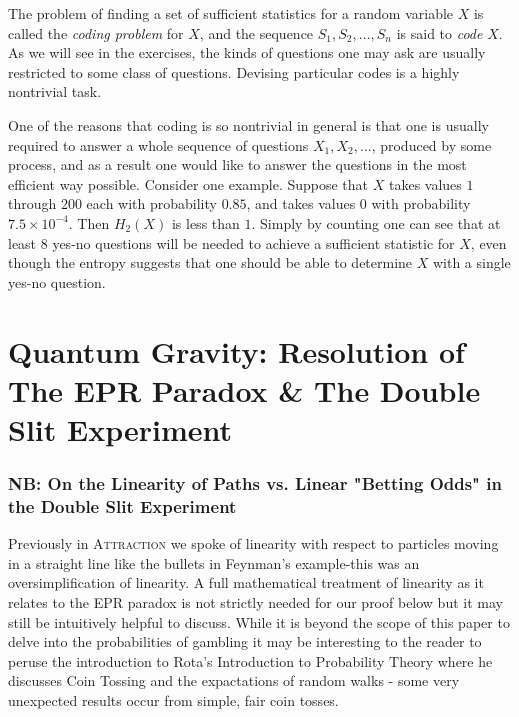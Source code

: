 \documentclass{report}
\begin{document}
The problem of finding a set of sufficient statistics for a random variable \( X \) is called the \emph{coding problem} for \( X \), and the sequence \( S_1, S_2, \ldots, S_n \) is said to \emph{code} \( X \). As we will see in the exercises, the kinds of questions one may ask are usually restricted to some class of questions. Devising particular codes is a highly nontrivial task.

One of the reasons that coding is so nontrivial in general is that one is usually required to answer a whole sequence of questions \( X_1, X_2, \ldots \), produced by some process, and as a result one would like to answer the questions in the most efficient way possible. Consider one example. Suppose that \( X \) takes values \( 1 \) through \( 200 \) each with probability \( 0.85 \), and takes values \( 0 \) with probability \( 7.5 \times 10^{-4} \). Then \( H_2(X) \) is less than \( 1 \). Simply by counting one can see that at least \( 8 \) yes-no questions will be needed to achieve a sufficient statistic for \( X \), even though the entropy suggests that one should be able to determine \( X \) with a single yes-no question.

\section*{Quantum Gravity: Resolution of The EPR Paradox \& The Double Slit Experiment}

\subsubsection*{NB: On the Linearity of Paths vs. Linear "Betting Odds" in the Double Slit Experiment}
Previously in \textsc{Attraction} we spoke of linearity with respect to particles moving in a straight line like the bullets in Feynman's example-this was an oversimplification of linearity. A full mathematical treatment of linearity as it relates to the EPR paradox is not strictly needed for our proof below but it may still be intuitively helpful to discuss.  While it is beyond the scope of this paper to delve into the probabilities of gambling it may be interesting to the reader to peruse the introduction to Rota's Introduction to Probability Theory\cite{Rota1997} where he discusses Coin Tossing and the expactations of random walks - some very unexpected results occur from simple, fair coin tosses.\cite{Rota1985} 
\end{document}
